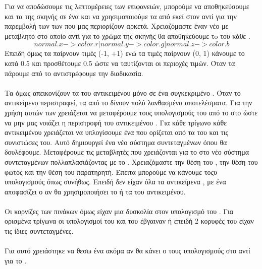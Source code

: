 \documentclass[11pt]{scrartcl} %
\begin{document}
Για να αποδώσουμε τις λεπτομέρειες των επιφανειών, μπορούμε να αποθηκεύσουμε και τα  της σκηνής σε ένα 
 και να χρησιμοποιούμε τα  από εκεί στον  αντί για την παρεμβολή των
 των  που μας περιορίζουν αρκετά. Χρειαζόμαστε έναν νέο  με μεταβλητό 
στο οποίο αντί για το χρώμα της σκηνής θα αποθηκεύουμε τo  του κάθε . 
$$ normal.x -> color.r | normal.y -> color.g | normal.z -> color.b $$
Επειδή όμως τα  παίρνουν τιμές (-1, +1) ενώ τα  τιμές παίρνουν (0, 1) κάνουμε  το 
κατά 0.5 και προσθέτουμε 0.5 ώστε να ταυτίζονται οι περιοχές τιμών. Όταν τα πάρουμε από το  αντιστρέφουμε την διαδικασία.
\\\\
Τα  όμως απεικονίζουν τα  του αντικειμένου μόνο σε ένα συγκεκριμένο . Όταν το αντικείμενο
περιστραφεί, τα  από το  δίνουν πολύ λανθασμένα αποτελέσματα.
Για την χρήση αυτών των  χρειάζεται να μεταφέρουμε τους υπολογισμούς του  από το 
 στο  ώστε να μην μας νοιάζει η περιστροφή του αντικειμένου \cite{Bump}. 
Για κάθε τρίγωνο κάθε αντικειμένου χρειάζεται να υπλογίσουμε ένα  που ορίζεται από τα  
του και τις  συνιστώσες του. Αυτό δημιουργεί ένα νέο σύστημα συντεταγμένων όπου θα δουλέφουμε.
\clearpage
Μεταφέρουμε τις μεταβλητές που χρειάζονται για το  στο νέο σύστημα συντεταγμένων πολλαπλασιάζοντας με
το . Χρειαζόμαστε την θέση του , την θέση του φωτός και την θέση του παρατηρητή.
Έπειτα μπορούμε να κάνουμε τοςυ υπολογισμούς όπως συνήθως. Επειδή δεν είχαν όλα τα αντικείμενα , με ένα 
αποφασίζει ο  αν θα χρησιμοποιήσει το  ή τα  του αντικειμένου.
\\\\
Οι κορνίζες των πινάκων όμως είχαν μια δυσκολία στον υπολογισμό του . Για ορισμένα τρίγωνα οι υπολογισμοί του
 και του  έβγαιναν  ή  επειδή 2 κορυφές του είχαν τις ίδιες  συντεταγμένες.
\\\\ Για αυτό χρειάστηκε να θεσω ένα ακόμα  αν θα κάνει ο  τους υπολογισμούς στο  αντί για το
.
\end{document}
